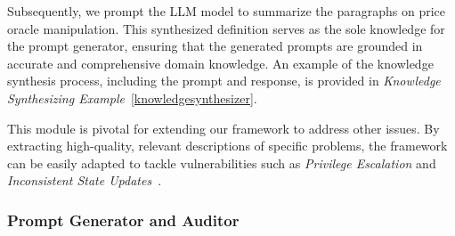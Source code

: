 Subsequently, we prompt the LLM model to summarize the paragraphs on price oracle manipulation. This synthesized definition serves as the sole knowledge for the prompt generator, ensuring that the generated prompts are grounded in accurate and comprehensive domain knowledge.
An example of the knowledge synthesis process, including the prompt and response, is provided in \textit{Knowledge Synthesizing Example}~\ref{knowledgesynthesizer}.

This module is pivotal for extending our framework to address other issues. By extracting high-quality, relevant descriptions of specific problems, the framework can be easily adapted to tackle vulnerabilities such as \textit{Privilege Escalation} and \textit{Inconsistent State Updates}~\cite{zhang2023demystifying}.


\subsubsection{Prompt Generator and Auditor}



